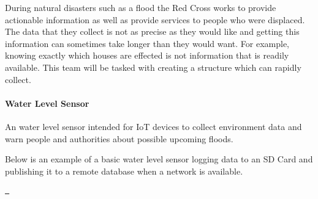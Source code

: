 During natural disasters such as a flood the Red Cross works to provide actionable information as well as provide services to people who were displaced. The data that they collect is not as precise as they would like and getting this information can sometimes take longer than they would want. For example, knowing exactly which houses are effected is not information that is readily available. This team will be tasked with creating a structure which can rapidly collect.

\paragraph*{Water Level Sensor}

An water level sensor intended for IoT devices to collect environment data and warn people and authorities about possible upcoming floods.

Below is an example of a basic water level sensor logging data to an SD Card and publishing it to a remote database when a network is available.

\href{https://asciinema.org/a/cQHXqYyGQqI19gyf3G9TTjOhK}{\texttt{ }} 